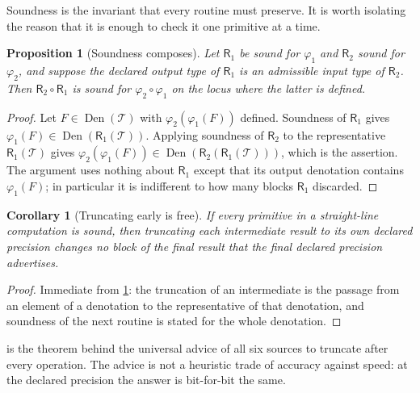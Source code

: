 \documentclass[11pt,oneside]{article}
\theoremstyle{plain}
\newtheorem{proposition}[theorem]{Proposition}
\newtheorem{corollary}[theorem]{Corollary}
\theoremstyle{definition}
\theoremstyle{remark}
\begin{document}
Soundness is the invariant that every routine must preserve.  It is worth
isolating the reason that it is enough to check it one primitive at a time.

\begin{proposition}[Soundness composes]\label{plt:prop:alg-soundness-composes}
Let \(\mathsf R_1\) be sound for \(\varphi_1\) and \(\mathsf R_2\) sound for
\(\varphi_2\), and suppose the declared output type of \(\mathsf R_1\) is an
admissible input type of \(\mathsf R_2\).  Then
\(\mathsf R_2\circ\mathsf R_1\) is sound for \(\varphi_2\circ\varphi_1\) on the
locus where the latter is defined.
\end{proposition}

\begin{proof}
Let \(F\in\operatorname{Den}(\mathcal T)\) with \(\varphi_2(\varphi_1(F))\) defined.
Soundness of \(\mathsf R_1\) gives
\(\varphi_1(F)\in\operatorname{Den}(\mathsf R_1(\mathcal T))\).  Applying soundness of
\(\mathsf R_2\) to the representative \(\mathsf R_1(\mathcal T)\) gives
\(\varphi_2(\varphi_1(F))\in\operatorname{Den}(\mathsf R_2(\mathsf R_1(\mathcal T)))\), which
is the assertion.  The argument uses nothing about \(\mathsf R_1\) except that
its output denotation contains \(\varphi_1(F)\); in particular it is
indifferent to how many blocks \(\mathsf R_1\) discarded.
\end{proof}

\begin{corollary}[Truncating early is free]\label{plt:cor:alg-truncate-early}
If every primitive in a straight-line computation is sound, then truncating
each intermediate result to its own declared precision changes no block of the
final result that the final declared precision advertises.
\end{corollary}

\begin{proof}
Immediate from \cref{plt:prop:alg-soundness-composes}: the truncation of an
intermediate is the passage from an element of a denotation to the
representative of that denotation, and soundness of the next routine is stated
for the whole denotation.
\end{proof}

 is the theorem behind the universal advice of
all six sources to truncate after every operation.  The advice is not a
heuristic trade of accuracy against speed: at the declared precision the answer
is bit-for-bit the same.
\end{document}
